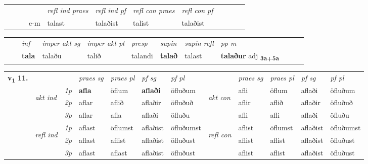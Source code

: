 \begin{tabular}{llllllllllll}
 & &  & &  \textit{refl ind praes} & \textit{refl ind pf} & \textit{refl con praes} & \textit{refl con pf} \\*
&  & & e-m & talast & talaðist & talist & talaðist \\*
\cmidrule{5-9}
\end{tabular}


\begin{tabular}{llllllllllll}
 & & \textit{inf} & \textit{imper akt sg} & \textit{imper akt pl}   & \textit{presp} & \textit{supin} & \textit{supin refl} & \textit{pp m}     \\*
  & & \textbf{tala} & talaðu  & talið   & talandi &  \textbf{talað} & talast & \textbf{talaður} adj \textbf{\textsubscript{3a+5a}} \\*
\cmidrule{1-12}
\end{tabular}



\begin{tabular}{llllllllllll} \toprule
\multirow{4}{*}{{{\textbf{v{\textsubscript{1}}} \Large{\textbf{11.}}}}}  & &   &  \textit{praes sg}  & \textit{praes pl}  &\textit{ pf sg} & \textit{pf pl} &  &  \textit{praes sg}  & \textit{praes pl}  & \textit{pf sg} & \textit{pf pl } \\*
	\cmidrule{4-7} \cmidrule{9-12}
 & \multirow{3}{*}{\begin{turn}{90}\textit{akt ind}\end{turn}} & {\textit{1p}} & \textbf{afla} & öflum    & \textbf{aflaði} & öfluðum & \multirow{3}{*}{\begin{turn}{90}\textit{akt con}\end{turn}} &afli & öflum & aflaði & öfluðum\\*
& &  {\textit{2p}} &  aflar  & aflið   & aflaðir & öfluðuð & & aflir & aflið & aflaðir & öfluðuð \\*
& &  {\textit{3p}} & aflar & afla   & aflaði & öfluðu & & afli & afli& aflaði & öfluðu  \\*
\cmidrule{4-7} \cmidrule{9-12}
 &\multirow{3}{*}{\begin{turn}{90}\textit{refl ind}\end{turn}} & {\textit{1p}} & aflast & öflumst    & aflaðist & öfluðumst & \multirow{3}{*}{\begin{turn}{90}\textit{refl con}\end{turn}}  &aflist & öflumst & aflaðist & öfluðumst\\*
 &&  {\textit{2p}} &  aflast  & aflist   & aflaðist & öfluðust & &aflist & aflist & aflaðist & öfluðust \\*
& &  {\textit{3p}} & aflast & aflast   & aflaðist & öfluðust & & aflist & aflist& aflaðist & öfluðust  \\*
\cmidrule{4-7} \cmidrule{9-12}
\end{tabular}


